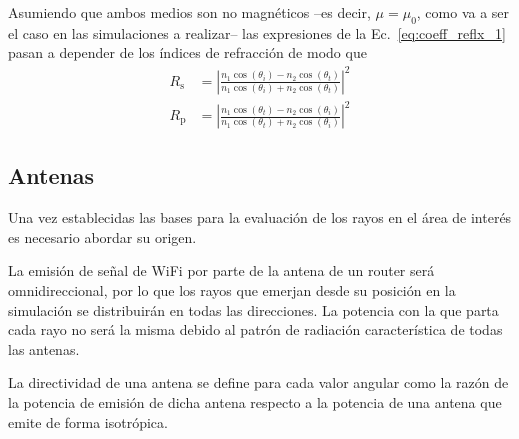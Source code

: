 Asumiendo que ambos medios son no magnéticos --es decir, $\mu = \mu_0$, como va a ser el caso en las simulaciones a realizar-- las expresiones de la Ec.~\eqref{eq:coeff_reflx_1} pasan a depender de los índices de refracción de modo que
\begin{equation}
    \label{eq:coeff_reflx_1}
    \begin{aligned}
        R_\mathrm{s} &= \left|\frac{n_1 \cos(\theta_i) - n_2\cos(\theta_t)}{n_1 \cos(\theta_i) + n_2\cos(\theta_t)}\right|^2\\
        R_\mathrm{p} &= \left|\frac{n_1 \cos(\theta_t) - n_2\cos(\theta_i)}{n_1 \cos(\theta_t) + n_2\cos(\theta_i)}\right|^2
    \end{aligned}
\end{equation}



\subsection{Antenas}

Una vez establecidas las bases para la evaluación de los rayos en el área de interés es necesario abordar su origen.

La emisión de señal de WiFi por parte de la antena de un router será omnidireccional, por lo que los rayos que emerjan desde su posición en la simulación se distribuirán en todas las direcciones.
La potencia con la que parta cada rayo no será la misma debido al patrón de radiación característica de todas las antenas.

La directividad de una antena se define para cada valor angular como la razón de la potencia de emisión de dicha antena respecto a la potencia de una antena que emite de forma isotrópica\cite{Antennas}.




